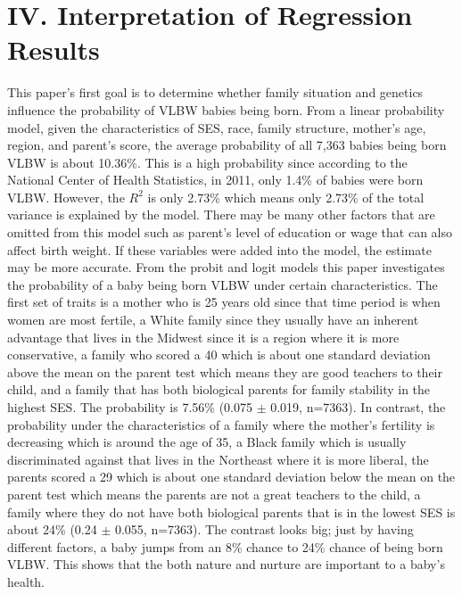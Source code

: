 \documentclass{article}
\begin{document}
\doublespace 

\section*{IV. Interpretation of Regression Results} 

This paper's first goal is to determine whether family situation and genetics influence the probability of VLBW babies being born. From a linear probability model, given the characteristics of SES, race, family structure, mother's age, region, and parent's score, the average probability of all 7,363 babies being born VLBW is about 10.36\%. This is a high probability since according to the National Center of Health Statistics, in 2011, only 1.4\% of babies were born VLBW. However, the $R^2$ is only 2.73\% which means only 2.73\% of the total variance is explained by the model. There may be many other factors that are omitted from this model such as parent's level of education or wage that can also affect birth weight. If these variables were added into the model, the estimate may be more accurate. From the probit and logit models this paper investigates the probability of a baby being born VLBW under certain characteristics. The first set of traits is a mother who is 25 years old since that time period is when women are most fertile, a White family since they usually have an inherent advantage that lives in the Midwest since it is a region where it is more conservative, a family who scored a 40 which is about one standard deviation above the mean on the parent test which means they are good teachers to their child, and a family that has both biological parents for family stability in the highest SES. The probability is 7.56\% (0.075 $\pm$ 0.019, n=7363). In contrast, the probability under the characteristics of a family where the mother's fertility is decreasing which is around the age of 35, a Black family which is usually discriminated against that lives in the Northeast where it is more liberal, the parents scored a 29 which is about one standard deviation below the mean on the parent test which means the parents are not a great teachers to the child, a family where they do not have both biological parents that is in the lowest SES is about 24\% (0.24 $\pm$ 0.055, n=7363). The contrast looks big; just by having different factors, a baby jumps from an 8\% chance to 24\% chance of being born VLBW. This shows that the both nature and nurture are important to a baby's health.
\end{document}
